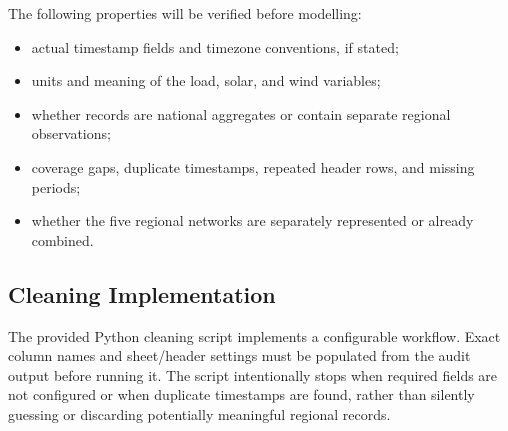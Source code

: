 \documentclass[12pt,a4paper]{article}
\begin{document}
The following properties will be verified before modelling:
\begin{itemize}[leftmargin=*]
  \item actual timestamp fields and timezone conventions, if stated;
  \item units and meaning of the load, solar, and wind variables;
  \item whether records are national aggregates or contain separate regional observations;
  \item coverage gaps, duplicate timestamps, repeated header rows, and missing periods;
  \item whether the five regional networks are separately represented or already combined.
\end{itemize}

\subsection{Cleaning Implementation}
The provided Python cleaning script implements a configurable workflow. Exact column names and sheet/header settings must be populated from the audit output before running it. The script intentionally stops when required fields are not configured or when duplicate timestamps are found, rather than silently guessing or discarding potentially meaningful regional records.
\end{document}
